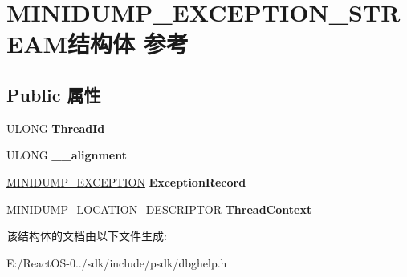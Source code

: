 \hypertarget{struct_m_i_n_i_d_u_m_p___e_x_c_e_p_t_i_o_n___s_t_r_e_a_m}{}\section{M\+I\+N\+I\+D\+U\+M\+P\+\_\+\+E\+X\+C\+E\+P\+T\+I\+O\+N\+\_\+\+S\+T\+R\+E\+A\+M结构体 参考}
\label{struct_m_i_n_i_d_u_m_p___e_x_c_e_p_t_i_o_n___s_t_r_e_a_m}
\subsection*{Public 属性}
\begin{DoxyCompactItemize}
\item 
\mbox{\label{struct_m_i_n_i_d_u_m_p___e_x_c_e_p_t_i_o_n___s_t_r_e_a_m_a2ce0cb9bc816822f1449f0b48f2b3787}} 
U\+L\+O\+NG {\bfseries Thread\+Id}
\item 
\mbox{\label{struct_m_i_n_i_d_u_m_p___e_x_c_e_p_t_i_o_n___s_t_r_e_a_m_a599e0a4e1f654774d41bfcadf31f04ac}} 
U\+L\+O\+NG {\bfseries \+\_\+\+\_\+alignment}
\item 
\mbox{\label{struct_m_i_n_i_d_u_m_p___e_x_c_e_p_t_i_o_n___s_t_r_e_a_m_a64d52a1f80f7f0a6f48d615bd1105c35}} 
\hyperlink{struct___m_i_n_i_d_u_m_p___e_x_c_e_p_t_i_o_n}{M\+I\+N\+I\+D\+U\+M\+P\+\_\+\+E\+X\+C\+E\+P\+T\+I\+ON} {\bfseries Exception\+Record}
\item 
\mbox{\label{struct_m_i_n_i_d_u_m_p___e_x_c_e_p_t_i_o_n___s_t_r_e_a_m_a5a49137fc0a19e8096504e16e954f351}} 
\hyperlink{struct___m_i_n_i_d_u_m_p___l_o_c_a_t_i_o_n___d_e_s_c_r_i_p_t_o_r}{M\+I\+N\+I\+D\+U\+M\+P\+\_\+\+L\+O\+C\+A\+T\+I\+O\+N\+\_\+\+D\+E\+S\+C\+R\+I\+P\+T\+OR} {\bfseries Thread\+Context}
\end{DoxyCompactItemize}


该结构体的文档由以下文件生成\+:\begin{DoxyCompactItemize}
\item 
E\+:/\+React\+O\+S-\/0../sdk/include/psdk/dbghelp.\+h\end{DoxyCompactItemize}
